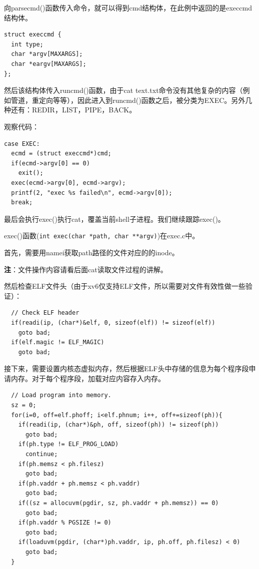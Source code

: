 向parsecmd()函数传入命令，就可以得到cmd结构体，在此例中返回的是execcmd结构体。

\begin{verbatim}
struct execcmd {
  int type;
  char *argv[MAXARGS];
  char *eargv[MAXARGS];
};
\end{verbatim}

然后该结构体传入runcmd()函数，由于cat text.txt命令没有其他复杂的内容（例如管道，重定向等等），因此进入到runcmd()函数之后，被分类为EXEC。另外几种还有：REDIR，LIST，PIPE，BACK。

观察代码：

\begin{verbatim}
case EXEC:
  ecmd = (struct execcmd*)cmd;
  if(ecmd->argv[0] == 0)
    exit();
  exec(ecmd->argv[0], ecmd->argv);
  printf(2, "exec %s failed\n", ecmd->argv[0]);
  break;
\end{verbatim}

最后会执行exec()执行cat，覆盖当前shell子进程。我们继续跟踪exec()。

exec()函数(\texttt{int exec(char *path, char **argv)})在exec.c中。

首先，需要用namei获取path路径的文件对应的的inode。

\textbf{注}：文件操作内容请看后面cat读取文件过程的讲解。

然后检查ELF文件头（由于xv6仅支持ELF文件，所以需要对文件有效性做一些验证）：

\begin{verbatim}
  // Check ELF header
  if(readi(ip, (char*)&elf, 0, sizeof(elf)) != sizeof(elf))
    goto bad;
  if(elf.magic != ELF_MAGIC)
    goto bad;
\end{verbatim}

接下来，需要设置内核态虚拟内存，然后根据ELF头中存储的信息为每个程序段申请内存。对于每个程序段，加载对应内容存入内存。

\begin{verbatim}
  // Load program into memory.
  sz = 0;
  for(i=0, off=elf.phoff; i<elf.phnum; i++, off+=sizeof(ph)){
    if(readi(ip, (char*)&ph, off, sizeof(ph)) != sizeof(ph))
      goto bad;
    if(ph.type != ELF_PROG_LOAD)
      continue;
    if(ph.memsz < ph.filesz)
      goto bad;
    if(ph.vaddr + ph.memsz < ph.vaddr)
      goto bad;
    if((sz = allocuvm(pgdir, sz, ph.vaddr + ph.memsz)) == 0)
      goto bad;
    if(ph.vaddr % PGSIZE != 0)
      goto bad;
    if(loaduvm(pgdir, (char*)ph.vaddr, ip, ph.off, ph.filesz) < 0)
      goto bad;
  }
\end{verbatim}

